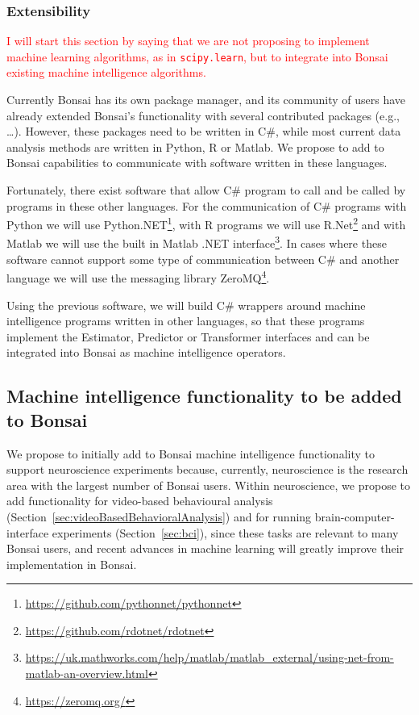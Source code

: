 \subsubsection{Extensibility}
\label{sec:extensibility}

\textcolor{red}{I will start this section by saying that we are not proposing
to implement machine learning algorithms, as in \texttt{scipy.learn}, but to
integrate into Bonsai existing machine intelligence algorithms.}

Currently Bonsai has its own package manager, and its community of users have
already extended Bonsai's functionality with several contributed packages
(e.g., \ldots). However, these packages need to be written in C\#, while most
current data analysis methods are written in Python, R or Matlab. We propose to
add to Bonsai capabilities to communicate with software written in these
languages.

Fortunately, there exist software that allow C\# program
to call and be called by programs in these other languages. For the
communication of C\# programs with Python we will use
Python.NET\footnote{\href{https://github.com/pythonnet/pythonnet}{https://github.com/pythonnet/pythonnet}},
with R programs we will use
R.Net\footnote{\href{https://github.com/rdotnet/rdotnet}{https://github.com/rdotnet/rdotnet}}
and with Matlab we will use the built in Matlab .NET
interface\footnote{\href{https://uk.mathworks.com/help/matlab/matlab\_external/using-net-from-matlab-an-overview.html}{https://uk.mathworks.com/help/matlab/matlab\_external/using-net-from-matlab-an-overview.html}}.
In cases where these software cannot support some type of communication between
C\# and another language we will use the messaging library
ZeroMQ\footnote{\href{https://zeromq.org/}{https://zeromq.org/}}.

Using the previous software, we will build C\# wrappers around machine
intelligence programs written in other languages, so that these programs
implement the Estimator, Predictor or Transformer interfaces and can be
integrated into Bonsai as machine intelligence operators.

\subsection{Machine intelligence functionality to be added to Bonsai}
\label{sec:functionality}

We propose to initially add to Bonsai machine intelligence functionality to
support neuroscience experiments because, currently, neuroscience is the
research area with the largest number of Bonsai users. Within neuroscience, we
propose to add functionality for video-based behavioural analysis
(Section~\ref{sec:videoBasedBehavioralAnalysis}) and for running
brain-computer-interface experiments (Section~\ref{sec:bci}), since these tasks
are relevant to many Bonsai users, and recent advances in machine learning
will greatly improve their implementation in Bonsai.

